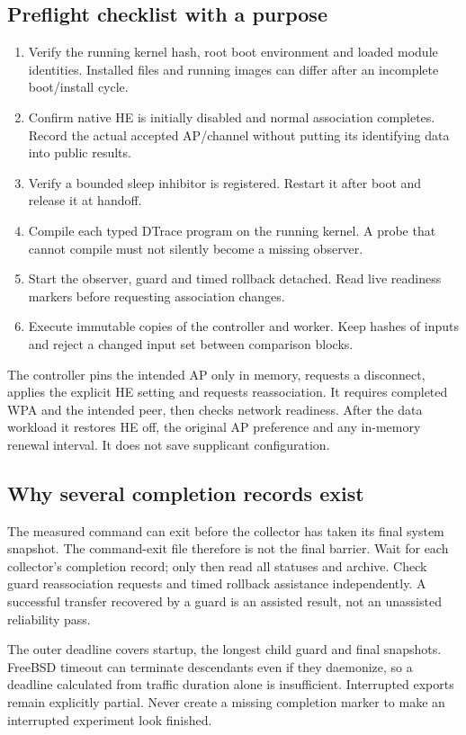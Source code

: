 \documentclass[11pt,letterpaper,oneside]{article}
\begin{document}
\subsection{Preflight checklist with a purpose}
\begin{enumerate}
\item Verify the running kernel hash, root boot environment and loaded module identities. Installed files and running images can differ after an incomplete boot/install cycle.
\item Confirm native HE is initially disabled and normal association completes. Record the actual accepted AP/channel without putting its identifying data into public results.
\item Verify a bounded sleep inhibitor is registered. Restart it after boot and release it at handoff.
\item Compile each typed DTrace program on the running kernel. A probe that cannot compile must not silently become a missing observer.
\item Start the observer, guard and timed rollback detached. Read live readiness markers before requesting association changes.
\item Execute immutable copies of the controller and worker. Keep hashes of inputs and reject a changed input set between comparison blocks.
\end{enumerate}
The controller pins the intended AP only in memory, requests a disconnect, applies the explicit HE setting and requests reassociation. It requires completed WPA and the intended peer, then checks network readiness. After the data workload it restores HE off, the original AP preference and any in-memory renewal interval. It does not save supplicant configuration.

\subsection{Why several completion records exist}
The measured command can exit before the collector has taken its final system snapshot. The command-exit file therefore is not the final barrier. Wait for each collector's completion record; only then read all statuses and archive. Check guard reassociation requests and timed rollback assistance independently. A successful transfer recovered by a guard is an assisted result, not an unassisted reliability pass.

The outer deadline covers startup, the longest child guard and final snapshots. FreeBSD timeout can terminate descendants even if they daemonize, so a deadline calculated from traffic duration alone is insufficient. Interrupted exports remain explicitly partial. Never create a missing completion marker to make an interrupted experiment look finished.
\end{document}
